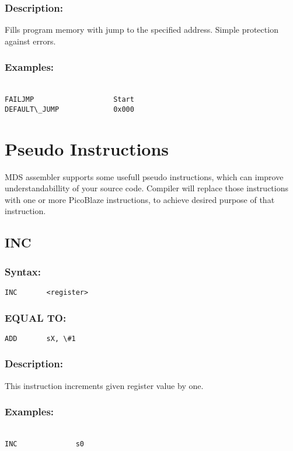 {        \subsubsection{Description:}
        Fills program memory with jump to the specified address. Simple protection against errors.

        \subsubsection{Examples:}
            {
                ~\\
                \usecodefont
                \verb'FAILJMP                   Start'\\
                \verb'DEFAULT\_JUMP             0x000'\\
            }


\section{Pseudo Instructions}
MDS assembler supports some usefull pseudo instructions, which can improve understandabillity of your source code. Compiler will replace those instructions with one or more PicoBlaze instructions, to achieve desired purpose of that instruction.

    \subsection{INC}
        \subsubsection{Syntax:}
            \verb'INC       <register>'

        \subsubsection{EQUAL TO:}
            \verb'ADD       sX, \#1'

        \subsubsection{Description:}
    This instruction increments given register value by one.
        \subsubsection{Examples:}
        {
            ~\\
            \usecodefont
            \verb'INC              s0'\\
        }

}
